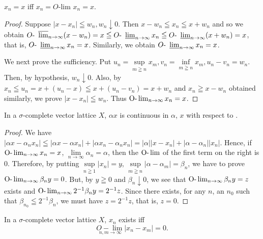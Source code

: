\begin{proposition}\label{prop:XII.2.Proposition.7} \Olim $x_{n} = x$ iff \Olim $x_{n} = O$-lim $x_{n} = x$. 
\end{proposition}

\begin{proof}
 Suppose $|x - x_n| \leqq w_n, w_n \downarrow 0$. Then $x - w_n \leqq x_n \leqq x + w_n$ and so we obtain $O\text{- }\varlimsup\limits_{n \to \infty} (x - w_n) = x \leqq O\text{- }\varliminf\limits_{n \to \infty} x_n \leqq O\text{- }\varliminf\limits_{n \to \infty} (x + w_n) = x$, that is, $O\text{- }\varliminf\limits_{n \to \infty} x_n = x$. Similarly, we obtain $O\text{- }\varliminf\limits_{n \to \infty} x_n = x$. 

We next prove the sufficiency. Put $u_{n} = \sup\limits_{m\geqq n}x_{m}, v_{n} = \inf\limits_{m\geqq n}x_{m}, u_{n} - v_{n} = w_{n}$. Then, by hypothesis, $w_{n}\downarrow 0$. Also, by $x_{n}\leqq u_{n} = x + (u_{n} - x)\leqq x + (u_{n} - v_{n}) = x + w_{n}$ and $x_{n}\geqq x - w_{n}$ obtained similarly, we prove $|x - x_n|\leqq w_n$. Thus $\Olim_{n\to \infty}x_n = x$. 
\end{proof}

\begin{proposition}\label{prop:XII.2.Proposition.8} In a $\sigma$-complete vector lattice $X$, $\alpha x$ is continuous in $\alpha$, $x$ with respect to \Olim. 
\end{proposition}

\begin{proof}
 We have $|\alpha x - \alpha_n x_n| \leqq |\alpha x - \alpha x_n| + |\alpha x_n - \alpha_n x_n| = |\alpha| |x - x_n| + |\alpha - \alpha_n| |x_n|$. Hence, if $\Olim_{n \to \infty} x_n = x$, $\lim\limits_{n \to \infty} \alpha_n = \alpha$, then the $\Olim$ of the first term on the right is $0$. Therefore, by putting $\sup\limits_{n \geqq 1} |x_n| = y$, $\sup\limits_{m \geqq n} |\alpha - \alpha_m| = \beta_n$, we have to prove $\Olim_{n \to \infty} \beta_n y = 0$. But, by $y \geqq 0$ and $\beta_n \downarrow 0$, we see that $\Olim_{n \to \infty} \beta_n y = z$ exists and $\Olim_{n \to \infty} 2^{-1} \beta_n y = 2^{-1} z$. Since there exists, for any $n$, an $n_0$ such that $\beta_{n_0} \leqq 2^{-1} \beta_n$, we must have $z = 2^{-1} z$, that is, $z = 0$. 
\end{proof}

\begin{proposition}\label{prop:XII.2.Proposition.9} In a $\sigma$-complete vector lattice $X$, \Olim $x_{n}$ exists iff 
\begin{equation}\label{eq:XII.2.27}
\underset {n, m \rightarrow \infty} {O - \lim} | x _{n} - x _{m} | = 0.
\end{equation}
\end{proposition}

